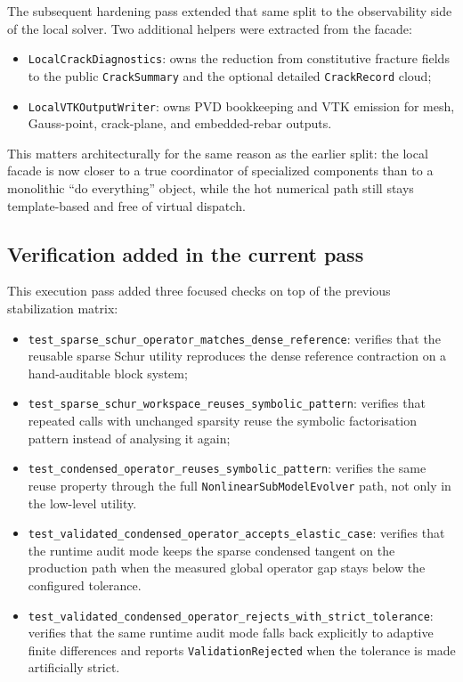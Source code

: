 The subsequent hardening pass extended that same split to the observability
side of the local solver.  Two additional helpers were extracted from the
facade:
\begin{itemize}
  \item \texttt{LocalCrackDiagnostics}: owns the reduction from constitutive
    fracture fields to the public \texttt{CrackSummary} and the optional
    detailed \texttt{CrackRecord} cloud;
  \item \texttt{LocalVTKOutputWriter}: owns PVD bookkeeping and VTK emission
    for mesh, Gauss-point, crack-plane, and embedded-rebar outputs.
\end{itemize}
This matters architecturally for the same reason as the earlier split: the
local facade is now closer to a true coordinator of specialized components than
to a monolithic ``do everything'' object, while the hot numerical path still
stays template-based and free of virtual dispatch.

\subsection{Verification added in the current pass}

This execution pass added three focused checks on top of the previous
stabilization matrix:
\begin{itemize}
  \item \texttt{test\_sparse\_schur\_operator\_matches\_dense\_reference}:
    verifies that the reusable sparse Schur utility reproduces the dense
    reference contraction on a hand-auditable block system;
  \item \texttt{test\_sparse\_schur\_workspace\_reuses\_symbolic\_pattern}:
    verifies that repeated calls with unchanged sparsity reuse the symbolic
    factorisation pattern instead of analysing it again;
  \item \texttt{test\_condensed\_operator\_reuses\_symbolic\_pattern}:
    verifies the same reuse property through the full
    \texttt{NonlinearSubModelEvolver} path, not only in the low-level utility.
  \item \texttt{test\_validated\_condensed\_operator\_accepts\_elastic\_case}:
    verifies that the runtime audit mode keeps the sparse condensed tangent on
    the production path when the measured global operator gap stays below the
    configured tolerance.
  \item \texttt{test\_validated\_condensed\_operator\_rejects\_with\_strict\_tolerance}:
    verifies that the same runtime audit mode falls back explicitly to adaptive
    finite differences and reports \texttt{ValidationRejected} when the
    tolerance is made artificially strict.
\end{itemize}

